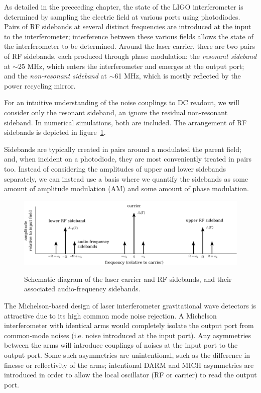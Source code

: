 As detailed in the preceeding chapter, the state of the LIGO interferometer is
determined by sampling the electric field at various ports using photodiodes.
Pairs of RF sidebands at several distinct frequencies are introduced at the
input to the interferometer; interference between these various fields allows
the state of the interferometer to be determined.  Around the laser carrier,
there are two pairs of RF sidebands, each produced through phase modulation: the
\emph{resonant sideband} at $\sim$25 MHz, which enters the interferometer and
emerges at the output port; and the \emph{non-resonant sideband} at $\sim$61
MHz, which is mostly reflected by the power recycling mirror.

For an intuitive understanding of the noise couplings to DC readout, we will
consider only the resonant sideband, an ignore the residual non-resonant
sideband.  In numerical simulations, both are included.  The arrangement of RF
sidebands is depicted in figure~\ref{fig:af-sidebands}.

Sidebands are typically created in pairs around a modulated the parent field;
and, when incident on a photodiode, they are most conveniently treated in pairs
too.  Instead of considering the amplitudes of upper and lower sidebands
separately, we can instead use a basis where we quantify the sidebands as some
amount of amplitude modulation (AM) and some amount of phase modulation.

\begin{figure}[]
\includegraphics[width=\columnwidth]{figures/af_sidebands.pdf}
\label{fig:af-sidebands}
\caption{Schematic diagram of the laser carrier and RF sidebands, and their
  associated audio-frequency sidebands.}
\end{figure}


The Michelson-based design of laser interferometer gravitational wave detectors
is attractive due to its high common mode noise rejection.  A Michelson
interferometer with identical arms would completely isolate the output port from
common-mode noises (i.e. noise introduced at the input port).  Any asymmetries
between the arms will introduce couplings of noises at the input port to the
output port.  Some such asymmetries are unintentional, such as the difference in
finesse or reflectivity of the arms; intentional DARM and MICH asymmetries are
introduced in order to allow the local oscillator (RF or carrier) to read the
output port.


